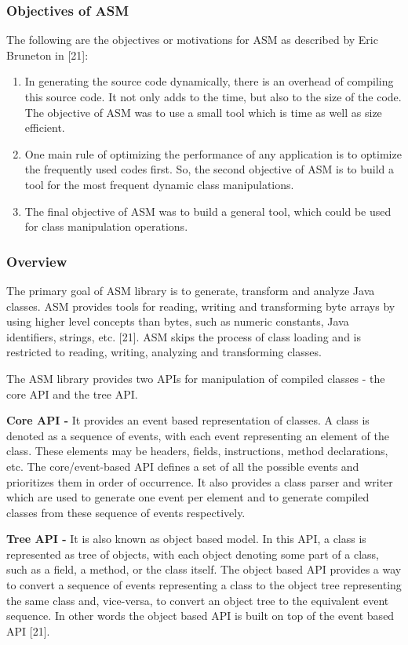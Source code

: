 \subsubsection{Objectives of ASM}
The following are the objectives or motivations for ASM as described by Eric Bruneton in [21]:
\begin{enumerate}
\item In generating the source code dynamically, there is an overhead of compiling this source code. It not only adds to the time, but also to the size of the code. The objective of ASM was to use a small tool which is time as well as size efficient.
\item One main rule of optimizing the performance of any application is to optimize the frequently used codes first. So, the second objective of ASM is to build a tool for the most frequent dynamic class manipulations.   
\item The final objective of ASM was to build a general tool, which could be used for class manipulation operations.
\end{enumerate}

\subsubsection{Overview}
The primary goal of ASM library is to generate, transform and analyze Java classes. ASM provides tools for reading, writing and transforming byte arrays by using higher level concepts than bytes, such as numeric constants, Java identifiers, strings, etc. [21]. ASM skips the process of class loading and is restricted to reading, writing, analyzing and transforming classes.

The ASM library provides two APIs for manipulation of compiled classes - the core API and the tree API.

\textbf{Core API -} It provides an event based representation of classes. A class is denoted as a sequence of events, with each event representing an element of the class. These elements may be headers, fields, instructions, method declarations, etc. The core/event-based API defines a set of all the possible events and prioritizes them in order of occurrence. It also provides a class parser and writer which are used to generate one event per element and to generate compiled classes from these sequence of events respectively.

\textbf{Tree API -} It is also known as object based model. In this API, a class is represented as tree of objects, with each object denoting some part of a class, such as a field, a method, or the class itself. The object based API provides a way to convert a sequence of events representing a class to the object tree representing the same class and, vice-versa, to convert an object tree to the equivalent event sequence. In other words the object based API is built on top of the event based API [21].

